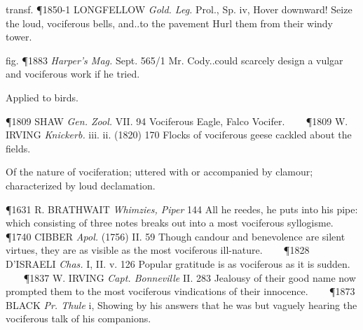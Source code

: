 \begin{description}[wide, labelwidth=!, labelindent=0pt]
\begin{myenumerate}
transf. \P 1850-1 LONGFELLOW  \textit{Gold. Leg.} Prol., Sp. iv, Hover downward! Seize the loud, vociferous bells, and..to the pavement Hurl them from their windy tower.

fig. \P 1883  \textit{Harper's Mag.} Sept. 565/1 Mr. Cody..could scarcely design a vulgar and vociferous work if he tried.

 Applied to birds.

\P 1809 SHAW  \textit{Gen. Zool.} VII. 94 Vociferous Eagle, Falco Vocifer.    
\P 1809 W. IRVING  \textit{Knickerb.} iii. ii. (1820) 170 Flocks of vociferous geese cackled about the fields.

 Of the nature of vociferation; uttered with or accompanied by clamour; characterized by loud declamation.

\P 1631 R. BRATHWAIT  \textit{Whimzies, Piper} 144 All he reedes, he puts into his pipe: which consisting of three notes breaks out into a most vociferous syllogisme.    
\P 1740 CIBBER  \textit{Apol.} (1756) II. 59 Though candour and benevolence are silent virtues, they are as visible as the most vociferous ill-nature.    
\P 1828 D'ISRAELI  \textit{Chas.} I, II. v. 126 Popular gratitude is as vociferous as it is sudden.    
\P 1837 W. IRVING  \textit{Capt. Bonneville} II. 283 Jealousy of their good name now prompted them to the most vociferous vindications of their innocence.    
\P 1873 BLACK  \textit{Pr. Thule} i, Showing by his answers that he was but vaguely hearing the vociferous talk of his companions.
\end{myenumerate}








\end{description}
